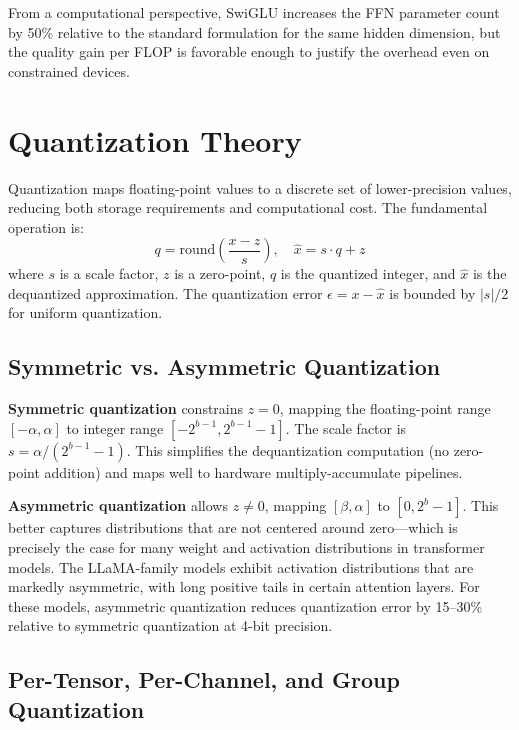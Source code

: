 \documentclass[12pt, letterpaper, twoside]{report}
\begin{document}
From a computational perspective, SwiGLU increases the FFN parameter count by 50\% relative to the standard formulation for the same hidden dimension, but the quality gain per FLOP is favorable enough to justify the overhead even on constrained devices.

\section{Quantization Theory}
\label{sec:quant_theory}

Quantization maps floating-point values to a discrete set of lower-precision values, reducing both storage requirements and computational cost. The fundamental operation is:
\begin{equation}
q = \text{round}\left(\frac{x - z}{s}\right), \quad \hat{x} = s \cdot q + z
\label{eq:quantize}
\end{equation}
where $s$ is a scale factor, $z$ is a zero-point, $q$ is the quantized integer, and $\hat{x}$ is the dequantized approximation. The quantization error $\epsilon = x - \hat{x}$ is bounded by $|s|/2$ for uniform quantization.

\subsection{Symmetric vs. Asymmetric Quantization}
\label{subsec:sym_asym}

\textbf{Symmetric quantization} constrains $z = 0$, mapping the floating-point range $[-\alpha, \alpha]$ to integer range $[-2^{b-1}, 2^{b-1} - 1]$. The scale factor is $s = \alpha / (2^{b-1} - 1)$. This simplifies the dequantization computation (no zero-point addition) and maps well to hardware multiply-accumulate pipelines.

\textbf{Asymmetric quantization} allows $z \neq 0$, mapping $[\beta, \alpha]$ to $[0, 2^b - 1]$. This better captures distributions that are not centered around zero---which is precisely the case for many weight and activation distributions in transformer models. The LLaMA-family models exhibit activation distributions that are markedly asymmetric, with long positive tails in certain attention layers. For these models, asymmetric quantization reduces quantization error by 15--30\% relative to symmetric quantization at 4-bit precision.

\subsection{Per-Tensor, Per-Channel, and Group Quantization}
\label{subsec:granularity}
\end{document}
